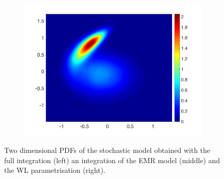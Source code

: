 \documentclass[12pt]{article}
\begin{document}
\begin{figure}[H]
\begin{subfigure}[b]{0.32\textwidth}
	\end{subfigure}
	\hfill
	\begin{subfigure}[b]{0.32\textwidth}
		\centering
		\includegraphics[width=\textwidth]{plots/climate_model/h01/pdf2d_wl_05_01.png}
	\end{subfigure}
	\caption{\label{climatologies 1}Two dimensional PDFs of the stochastic model obtained with the full integration (left) an integration of the EMR model (middle) and the WL parametrisation (right).}
\end{figure}
\end{document}
